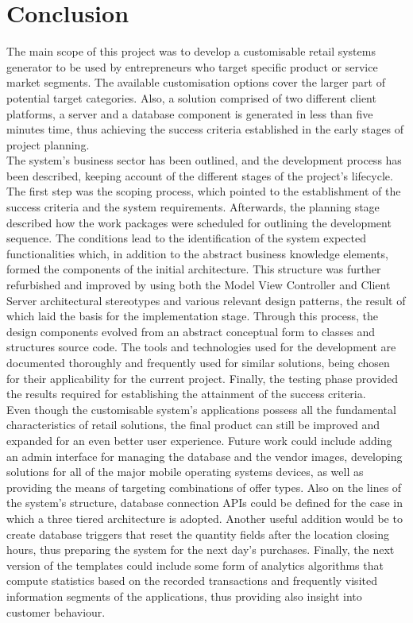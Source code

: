 \section{Conclusion}

The main scope of this project was to develop a customisable retail systems generator to be used by entrepreneurs who target specific product or service market segments. The available customisation options cover the larger part of potential target categories. Also, a solution comprised of two different client platforms, a server and a database component is generated in less than five minutes time, thus achieving the success criteria established in the early stages of project planning.\\

The system's business sector has been outlined, and the development process has been described, keeping account of the different stages of the project's lifecycle. The first step was the scoping process, which pointed to the establishment of the success criteria and the system requirements. Afterwards, the planning stage described how the work packages were scheduled for outlining the development sequence. The conditions lead to the identification of the system expected functionalities which, in addition to the abstract business knowledge elements, formed the components of the initial architecture. This structure was further refurbished and improved by using both the Model View Controller and Client Server architectural stereotypes and various relevant design patterns, the result of which laid the basis for the implementation stage. Through this process, the design components evolved from an abstract conceptual form to classes and structures source code. The tools and technologies used for the development are documented thoroughly and frequently used for similar solutions, being chosen for their applicability for the current project. Finally, the testing phase provided the results required for establishing the attainment of the success criteria.\\  

Even though the customisable system's applications possess all the fundamental characteristics of retail solutions, the final product can still be improved and expanded for an even better user experience. Future work could include adding an admin interface for managing the database and the vendor images, developing solutions for all of the major mobile operating systems devices, as well as providing the means of targeting combinations of offer types. Also on the lines of the system's structure, database connection APIs could be defined for the case in which a three tiered architecture is adopted. Another useful addition would be to create database triggers that reset the quantity fields after the location closing hours, thus preparing the system for the next day's purchases. Finally, the next version of the templates could include some form of analytics algorithms that compute statistics based on the recorded transactions and frequently visited information segments of the applications, thus providing also insight into customer behaviour.\\

